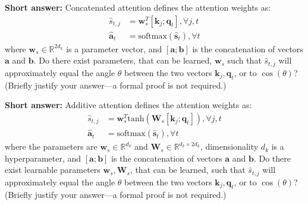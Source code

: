 \documentclass[11pt,addpoints,answers]{exam}
\newcommand{\Rb}{\mathbb{R}}
\newcommand{\av}{\mathbf{a}}
\newcommand{\bv}{\mathbf{b}}
\newcommand{\kv}{\mathbf{k}}
\newcommand{\qv}{\mathbf{q}}
\newcommand{\sv}{\mathbf{s}}
\newcommand{\wv}{\mathbf{w}}
\newcommand{\Wv}{\mathbf{W}}
\begin{document}
\begin{questions}
\begin{parts}
\begin{subparts}
    \subpart[2] \textbf{Short answer:} Concatenated attention defines the attention weights as:
    \begin{align*}
        \hat{s}_{t,j} &= \wv_s^T [ \kv_j ; \qv_t ], \forall j,t\\
        \hat{\av}_t &= \text{softmax}(\hat{\sv}_t), \forall t
    \end{align*}
    where $\wv_s \in \Rb^{2d_k}$ is a parameter vector, and $[\av; \bv]$ is the concatenation of vectors $\av$ and $\bv$.
    Do there exist parameters, that can be learned, $\wv_s$ such that $\hat{s}_{t,j}$ will approximately equal the angle $\theta$ between the two vectors $\kv_j,\qv_t$, or to $\cos(\theta)$? (Briefly justify your answer---a formal proof is not required.)

    \begin{answer_box}[title=,height=4cm,width=15cm]
    \end{answer_box}

\clearpage

    \subpart[2] \textbf{Short answer:} Additive attention defines the attention weights as:
    \begin{align*}
        \hat{s}_{t,j} &= \wv_s^T \text{tanh}(\Wv_s [ \kv_j ; \qv_t ]), \forall j,t\\
        \hat{\av}_t &= \text{softmax}(\hat{\sv}_t), \forall t
    \end{align*}
    where the parameters are $\wv_s \in \Rb^{d_k}$ and $\Wv_s \in \Rb^{d_k \times 2d_k}$, dimensionality $d_k$ is a hyperparameter, and $[\av; \bv]$ is the concatenation of vectors $\av$ and $\bv$.
    Do there exist learnable parameters $\wv_s, \Wv_s$, that can be learned, such that $\hat{s}_{t,j}$ will approximately equal the angle $\theta$ between the two vectors $\kv_j,\qv_t$, or to $\cos(\theta)$? (Briefly justify your answer---a formal proof is not required.)

    \begin{answer_box}[title=,height=4cm,width=15cm]
    \end{answer_box}

\end{subparts}



\end{parts}
\end{questions}
\end{document}

